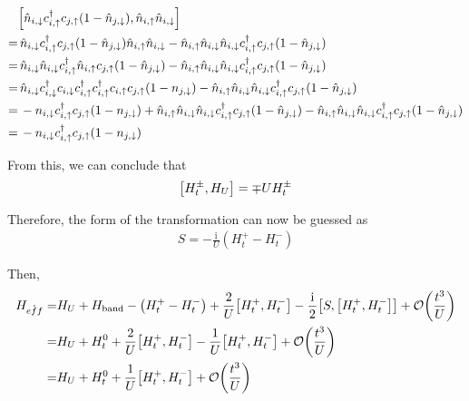 \documentclass[]{report}
\newcommand{\I}{\,\mathrm{i}\,}
\begin{document}
\begin{align}
\nonumber
&\comm{\hat{n}_{i, \downarrow} c^{\dagger}_{i,\uparrow} c_{j, \uparrow} (1 - \hat{n}_{j, \downarrow})}{ \hat{n}_{i, \uparrow} \hat{n}_{i, \downarrow} }\\
\nonumber
=&\,
\hat{n}_{i, \downarrow} c^{\dagger}_{i,\uparrow} c_{j, \uparrow} (1 - \hat{n}_{j, \downarrow}) \hat{n}_{i, \uparrow} \hat{n}_{i, \downarrow}
-
\hat{n}_{i, \uparrow} \hat{n}_{i, \downarrow} \hat{n}_{i, \downarrow} c^{\dagger}_{i,\uparrow} c_{j, \uparrow} (1 - \hat{n}_{j, \downarrow})\\
\nonumber
=&\,
\hat{n}_{i, \downarrow}\hat{n}_{i, \downarrow} c^{\dagger}_{i,\uparrow}\hat{n}_{i, \uparrow} c_{j, \uparrow} (1 - \hat{n}_{j, \downarrow})  
-
\hat{n}_{i, \uparrow} \hat{n}_{i, \downarrow} \hat{n}_{i, \downarrow} c^{\dagger}_{i,\uparrow} c_{j, \uparrow} (1 - \hat{n}_{j, \downarrow})\\
\nonumber
=&\,
\hat{n}_{i, \downarrow} c^{\dagger}_{i, \downarrow} c_{i, \downarrow} c^{\dagger}_{i, \uparrow} c^{\dagger}_{i, \uparrow} c_{i, \uparrow} c_{j, \uparrow} (1 - n_{j, \downarrow})
-
\hat{n}_{i, \uparrow} \hat{n}_{i, \downarrow} \hat{n}_{i, \downarrow} c^{\dagger}_{i,\uparrow} c_{j, \uparrow} (1 - \hat{n}_{j, \downarrow})\\
\nonumber
=&\,
-n_{i, \downarrow} c^{\dagger}_{i, \uparrow} c_{j, \uparrow} (1 - n_{j, \downarrow})
+
\hat{n}_{i, \uparrow} \hat{n}_{i, \downarrow} \hat{n}_{i, \downarrow} c^{\dagger}_{i,\uparrow} c_{j, \uparrow} (1 - \hat{n}_{j, \downarrow})
-
\hat{n}_{i, \uparrow} \hat{n}_{i, \downarrow} \hat{n}_{i, \downarrow} c^{\dagger}_{i,\uparrow} c_{j, \uparrow} (1 - \hat{n}_{j, \downarrow})\\
=&\,
-n_{i, \downarrow} c^{\dagger}_{i, \uparrow} c_{j, \uparrow} (1 - n_{j, \downarrow})
\end{align}

From this, we can conclude that
\begin{align}
\comm{H^{\pm}_{t}}{H_U} = \mp U H^{\pm}_{t}
\end{align}

Therefore, the form of the transformation can now be guessed as
\begin{align}
S = - \frac{\I}{U} \left( H^{+}_{t} - H^{-}_{t} \right)
\end{align}

Then,
\begin{align}
\nonumber
H_{\mathring{eff}} =& H_U + H_{\mathrm{band}} - \left( H^{+}_{t} - H^{-}_{t} \right) + \frac{2}{U} \comm{H^{+}_{t}}{H^{-}_{t}} - \frac{\I}{2} \comm{S}{\comm{H^{+}_{t}}{H^{-}_{t}}} + \order{\frac{t^3}{U}}\\
\nonumber
=& H_U + H^{0}_{t} + \frac{2}{U} \comm{H^{+}_{t}}{H^{-}_{t}} - \frac{1}{U} \comm{H^{+}_{t}}{H^{-}_{t}} + \order{\frac{t^3}{U}}\\
=& H_U + H^{0}_{t} + \frac{1}{U} \comm{H^{+}_{t}}{H^{-}_{t}} + \order{\frac{t^3}{U}}
\end{align}
\end{document}
